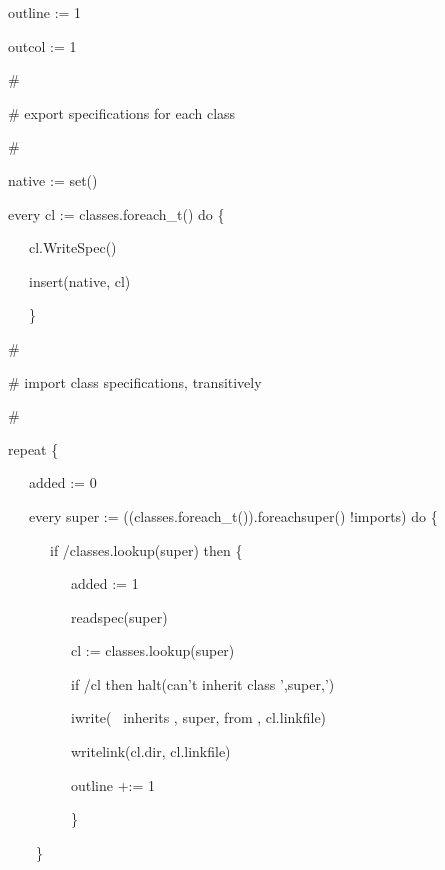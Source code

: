 {\ttfamily\mdseries
\ \ \ outline := 1}

{\ttfamily\mdseries
\ \ \ outcol := 1}

{\ttfamily\mdseries
\ \ \ \#}

{\ttfamily\mdseries
\ \ \ \# export specifications for each class}

{\ttfamily\mdseries
\ \ \ \#}

{\ttfamily\mdseries
\ \ \ native := set()}

{\ttfamily\mdseries
\ \ \ every cl := classes.foreach\_t() do \{}

{\ttfamily\mdseries
\ \ \ \ \ \ cl.WriteSpec()}

{\ttfamily\mdseries
\ \ \ \ \ \ insert(native, cl)}

{\ttfamily\mdseries
\ \ \ \ \ \ \}}

{\ttfamily\mdseries
\ \ \ \#}

{\ttfamily\mdseries
\ \ \ \# import class specifications, transitively}

{\ttfamily\mdseries
\ \ \ \#}

{\ttfamily\mdseries
\ \ \ repeat \{}

{\ttfamily\mdseries
\ \ \ \ \ \ added := 0}

{\ttfamily\mdseries
\ \ \ \ \ \ every super := ((classes.foreach\_t()).foreachsuper() {\textbar} !imports) do \{}

{\ttfamily\mdseries
\ \ \ \ \ \ \ \ \ if /classes.lookup(super) then \{}

{\ttfamily\mdseries
\ \ \ \ \ \ \ \ \ \ \ \ added := 1}

{\ttfamily\mdseries
\ \ \ \ \ \ \ \ \ \ \ \ readspec(super)}

{\ttfamily\mdseries
\ \ \ \ \ \ \ \ \ \ \ \ cl := classes.lookup(super)}

{\ttfamily\mdseries
\ \ \ \ \ \ \ \ \ \ \ \ if /cl then halt({\textquotedbl}can't inherit class
'{\textquotedbl},super,{\textquotedbl}'{\textquotedbl})}

{\ttfamily\mdseries
\ \ \ \ \ \ \ \ \ \ \ \ iwrite({\textquotedbl} \ inherits {\textquotedbl}, super, {\textquotedbl} from {\textquotedbl},
cl.linkfile)}

{\ttfamily\mdseries
\ \ \ \ \ \ \ \ \ \ \ \ writelink(cl.dir, cl.linkfile)}

{\ttfamily\mdseries
\ \ \ \ \ \ \ \ \ \ \ \ outline +:= 1}

{\ttfamily\mdseries
\ \ \ \ \ \ \ \ \ \ \ \ \}}

{\ttfamily\mdseries
\ \ \ \ \ \ \ \}}

